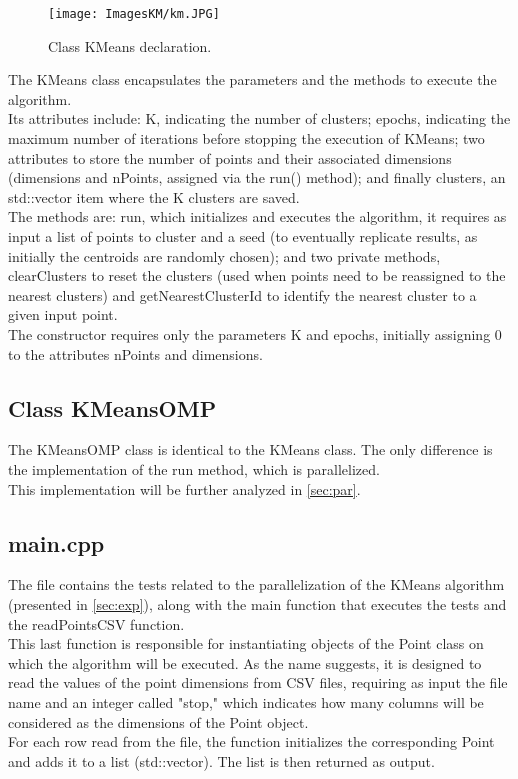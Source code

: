 \documentclass[10pt,twocolumn,letterpaper]{article}
\begin{document}
\begin{figure}[h]
    \centering
    \texttt{[image: ImagesKM/km.JPG]}
    \caption{Class KMeans declaration.}
    \label{fig:km}
\end{figure}

The KMeans class encapsulates the parameters and the methods to execute the algorithm.\\
Its attributes include: K, indicating the number of clusters; epochs, indicating the maximum number of iterations before stopping the execution of KMeans; two attributes to store the number of points and their associated dimensions (dimensions and nPoints, assigned via the run() method); and finally clusters, an std::vector item where the K clusters are saved.\\
The methods are: run, which initializes and executes the algorithm, it requires as input a list of points to cluster and a seed (to eventually replicate results, as initially the centroids are randomly chosen); and two private methods, clearClusters to reset the clusters (used when points need to be reassigned to the nearest clusters) and getNearestClusterId to identify the nearest cluster to a given input point.\\
The constructor requires only the parameters K and epochs, initially assigning 0 to the attributes nPoints and dimensions.

\subsection{Class KMeansOMP}
The KMeansOMP class is identical to the KMeans class. The only difference is the implementation of the run method, which is parallelized.\\
This implementation will be further analyzed in \cref{sec:par}.

\subsection{main.cpp}
The file contains the tests related to the parallelization of the KMeans algorithm (presented in \cref{sec:exp}), along with the main function that executes the tests and the readPointsCSV function.\\
This last function is responsible for instantiating objects of the Point class on which the algorithm will be executed. As the name suggests, it is designed to read the values of the point dimensions from CSV files, requiring as input the file name and an integer called "stop," which indicates how many columns will be considered as the dimensions of the Point object.\\
For each row read from the file, the function initializes the corresponding Point and adds it to a list (std::vector). The list is then returned as output.
\end{document}

